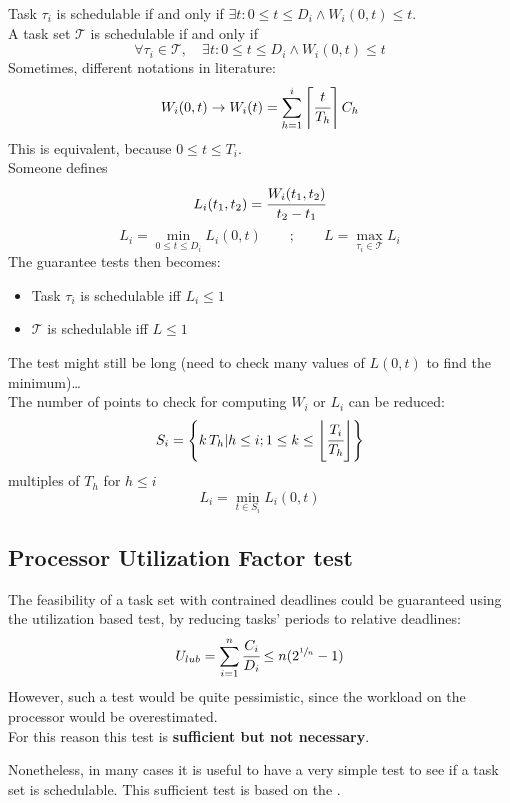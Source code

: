    Task $\tau_i$ is schedulable if and only if $\exists t : 0 \le t \le D_i \wedge W_i(0,t) \le t$.\\
    A task set $\mathcal{T}$ is schedulable if and only if
    \[\forall \tau_i \in \mathcal{T},\quad \exists t : 0 \le t \le D_i \wedge W_i(0,t) \le t\]
    Sometimes, different notations in literature:
    \[W_i(0,t)\rightarrow W_i(t) = \sum_{h=1}^i \left\lceil \cfrac{t}{T_h} \right\rceil C_h\]
    This is equivalent, because $0 \le t \le T_i$.\\
    Someone defines 
    \[L_i(t_1,t_2) = \cfrac{W_i(t_1, t_2)}{t_2 - t_1}\]
    \[L_i = \min_{0\le t\le D_i} L_i(0,t)\qquad;\qquad L = \max_{\tau_i \in \mathcal{T}} L_i\]
    The guarantee tests then becomes:
    \begin{itemize}
        \item Task $\tau_i$ is schedulable iff $L_i \le 1$
        \item $\mathcal{T}$ is schedulable iff $L \le 1$
    \end{itemize}
    The test might still be long (need to check many values of $L(0,t)$ to find the minimum)\dots\\
    The number of points to check for computing $W_i$ or $L_i$ can be reduced:
    \[S_i = \left\{k\,T_h | h \le i; 1 \le k \le \left\lfloor \cfrac{T_i}{T_h} \right\rfloor\right\}\]
    multiples of $T_h$ for $h \le i$
    \[L_i = \min_{t\in S_i} L_i(0,t)\]


\subsection{Processor Utilization Factor test}
The feasibility of a task set with contrained deadlines could be guaranteed using the utilization based test, by reducing tasks' periods to relative deadlines:
\[U_{lub} = \sum_{i=1}^n \cfrac{C_i}{D_i} \le n(2^{\sfrac{1}{n}}-1)\]
However, such a test would be quite pessimistic, since the workload on the processor would be overestimated.\\
For this reason this test is \textbf{sufficient but not necessary}.

Nonetheless, in many cases it is useful to have a very simple test to see if a task set is schedulable.
This sufficient test is based on the .

